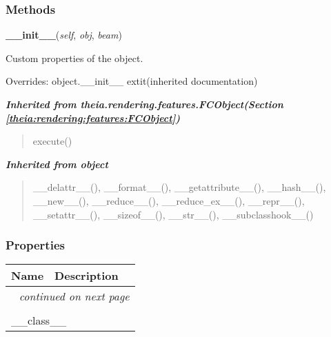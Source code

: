 
  \subsubsection{Methods}

    \vspace{0.5ex}

\hspace{.8\funcindent}\begin{boxedminipage}{\funcwidth}

    \raggedright \textbf{\_\_init\_\_}(\textit{self}, \textit{obj}, \textit{beam})

\setlength{\parskip}{2ex}
    Custom properties of the object.

\setlength{\parskip}{1ex}
      Overrides: object.\_\_init\_\_ 	extit{(inherited documentation)}

    \end{boxedminipage}


\large{\textbf{\textit{Inherited from theia.rendering.features.FCObject\textit{(Section \ref{theia:rendering:features:FCObject})}}}}

\begin{quote}
execute()
\end{quote}

\large{\textbf{\textit{Inherited from object}}}

\begin{quote}
\_\_delattr\_\_(), \_\_format\_\_(), \_\_getattribute\_\_(), \_\_hash\_\_(), \_\_new\_\_(), \_\_reduce\_\_(), \_\_reduce\_ex\_\_(), \_\_repr\_\_(), \_\_setattr\_\_(), \_\_sizeof\_\_(), \_\_str\_\_(), \_\_subclasshook\_\_()
\end{quote}


  \subsubsection{Properties}

    \vspace{-1cm}
\hspace{\varindent}\begin{longtable}{|p{\varnamewidth}|p{\vardescrwidth}|l}
\cline{1-2}
\cline{1-2} \centering \textbf{Name} & \centering \textbf{Description}& \\
\cline{1-2}
\endhead\cline{1-2}\multicolumn{3}{r}{\small\textit{continued on next page}}\\\endfoot\cline{1-2}
\endlastfoot\multicolumn{2}{|l|}{\textit{Inherited from object}}\\
\multicolumn{2}{|p{\varwidth}|}{\raggedright \_\_class\_\_}\\
\cline{1-2}
\end{longtable}


